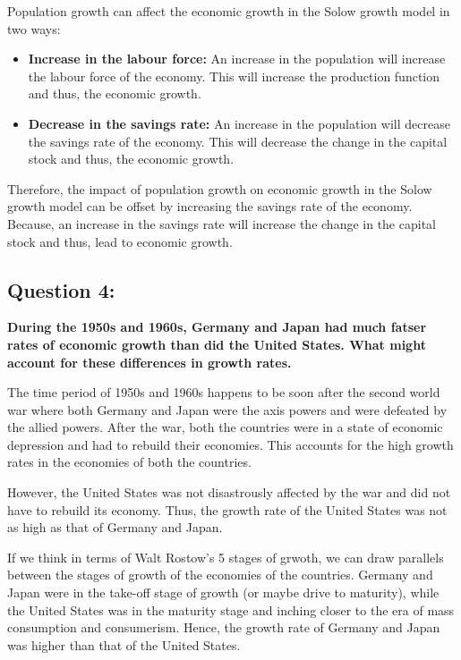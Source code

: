 \documentclass{article}
\begin{document}
Population growth can affect the economic growth in the Solow growth model in two ways:
\begin{itemize}
    \item \textbf{Increase in the labour force:} An increase in the population will increase the labour force of the economy.
          This will increase the production function and thus, the economic growth.
    \item \textbf{Decrease in the savings rate:} An increase in the population will decrease the savings rate of the economy.
          This will decrease the change in the capital stock and thus, the economic growth.
\end{itemize}

Therefore, the impact of population growth on economic growth in the Solow growth model can be offset by increasing 
the savings rate of the economy.
Because, an increase in the savings rate will increase the change in the capital stock and thus, lead to 
economic growth.



\subsection*{Question 4:}
\textbf{During the 1950s and 1960s, Germany and Japan had much fatser rates of economic growth than did the United States.
What might account for these differences in growth rates.}

The time period of 1950s and 1960s happens to be soon after the second world war where both Germany and Japan were
the axis powers and were defeated by the allied powers. 
After the war, both the countries were in a state of economic depression and had to rebuild their economies.
This accounts for the high growth rates in the economies of both the countries.

However, the United States was not disastrously affected by the war and did not have to rebuild its economy.
Thus, the growth rate of the United States was not as high as that of Germany and Japan.

If we think in terms of Walt Rostow's 5 stages of grwoth, we can draw parallels between the stages of growth of the economies of the countries.
Germany and Japan were in the take-off stage of growth (or maybe drive to maturity), while the United States was in the maturity stage and inching closer to the era of mass consumption and consumerism.
Hence, the growth rate of Germany and Japan was higher than that of the United States.
\end{document}
